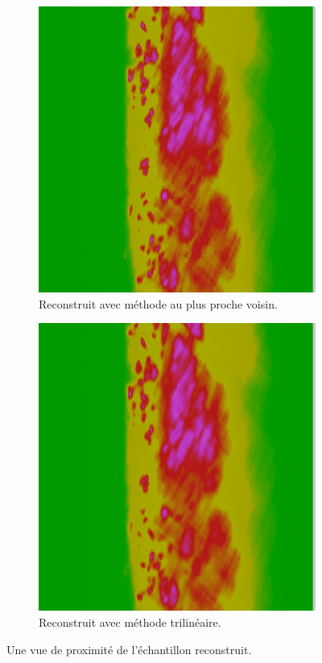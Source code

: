 {{{\begin{figure}[h]
\begin{subfigure}{.5\linewidth}
                    \includegraphics[width=.9\linewidth]{img/results/nearest.png}
                    \captionsetup{width=.9\linewidth}
                    \caption{Reconstruit avec méthode au plus proche voisin.}
                    \label{img:results:nearest}
                \end{subfigure}
                \begin{subfigure}{.5\linewidth}
                    \centering
                    \includegraphics[width=.9\linewidth]{img/results/trilinear.png}
                    \captionsetup{width=.9\linewidth}
                    \caption{Reconstruit avec méthode trilinéaire.}
                    \label{img:results:trlinear}
                \end{subfigure}
                \captionsetup{width=.9\linewidth}
                \caption{Une vue de proximité de l'échantillon reconstruit.}
                \label{img:results}
            \end{figure}
            
}}}
